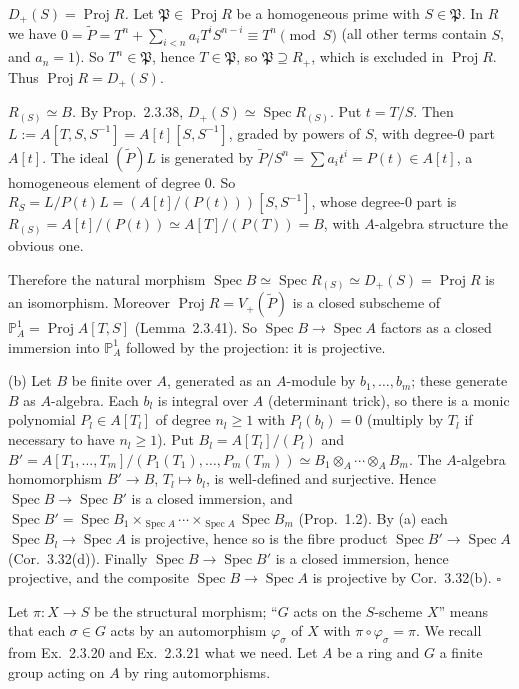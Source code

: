 \documentclass[11pt]{article}
\begin{document}
\emph{$D_+(S)=\operatorname{Proj}R$.} Let $\mathfrak P\in\operatorname{Proj}R$ be a homogeneous prime with $S\in\mathfrak P$. In $R$ we have $0=\tilde P=T^n+\sum_{i<n}a_iT^iS^{n-i}\equiv T^n \pmod{S}$ (all other terms contain $S$, and $a_n=1$). So $T^n\in\mathfrak P$, hence $T\in\mathfrak P$, so $\mathfrak P\supseteq R_+$, which is excluded in $\operatorname{Proj}R$. Thus $\operatorname{Proj}R=D_+(S)$.

\emph{$R_{(S)}\simeq B$.} By Prop.~2.3.38, $D_+(S)\simeq\operatorname{Spec}R_{(S)}$. Put $t=T/S$. Then $L:=A[T,S,S^{-1}]=A[t][S,S^{-1}]$, graded by powers of $S$, with degree-$0$ part $A[t]$. The ideal $(\tilde P)L$ is generated by $\tilde P/S^n=\sum a_it^i=P(t)\in A[t]$, a homogeneous element of degree $0$. So $R_S=L/P(t)L=(A[t]/(P(t)))[S,S^{-1}]$, whose degree-$0$ part is $R_{(S)}=A[t]/(P(t))\simeq A[T]/(P(T))=B$, with $A$-algebra structure the obvious one.

Therefore the natural morphism $\operatorname{Spec}B\simeq\operatorname{Spec}R_{(S)}\simeq D_+(S)=\operatorname{Proj}R$ is an isomorphism. Moreover $\operatorname{Proj}R=V_+(\tilde P)$ is a closed subscheme of $\mathbb{P}^1_A=\operatorname{Proj}A[T,S]$ (Lemma~2.3.41). So $\operatorname{Spec}B\to\operatorname{Spec}A$ factors as a closed immersion into $\mathbb{P}^1_A$ followed by the projection: it is projective.

(b) Let $B$ be finite over $A$, generated as an $A$-module by $b_1,\dots,b_m$; these generate $B$ as $A$-algebra. Each $b_l$ is integral over $A$ (determinant trick), so there is a monic polynomial $P_l\in A[T_l]$ of degree $n_l\ge1$ with $P_l(b_l)=0$ (multiply by $T_l$ if necessary to have $n_l\ge1$). Put $B_l=A[T_l]/(P_l)$ and $B'=A[T_1,\dots,T_m]/(P_1(T_1),\dots,P_m(T_m))\simeq B_1\otimes_A\cdots\otimes_AB_m$. The $A$-algebra homomorphism $B'\to B$, $T_l\mapsto b_l$, is well-defined and surjective. Hence $\operatorname{Spec}B\to\operatorname{Spec}B'$ is a closed immersion, and $\operatorname{Spec}B'=\operatorname{Spec}B_1\times_{\operatorname{Spec}A}\cdots\times_{\operatorname{Spec}A}\operatorname{Spec}B_m$ (Prop.~1.2). By (a) each $\operatorname{Spec}B_l\to\operatorname{Spec}A$ is projective, hence so is the fibre product $\operatorname{Spec}B'\to\operatorname{Spec}A$ (Cor.~3.32(d)). Finally $\operatorname{Spec}B\to\operatorname{Spec}B'$ is a closed immersion, hence projective, and the composite $\operatorname{Spec}B\to\operatorname{Spec}A$ is projective by Cor.~3.32(b). \hfill$\square$

\pf
Let $\pi:X\to S$ be the structural morphism; ``$G$ acts on the $S$-scheme $X$'' means that each $\sigma\in G$ acts by an automorphism $\varphi_\sigma$ of $X$ with $\pi\circ\varphi_\sigma=\pi$. We recall from Ex.~2.3.20 and Ex.~2.3.21 what we need. Let $A$ be a ring and $G$ a finite group acting on $A$ by ring automorphisms.
\end{document}
